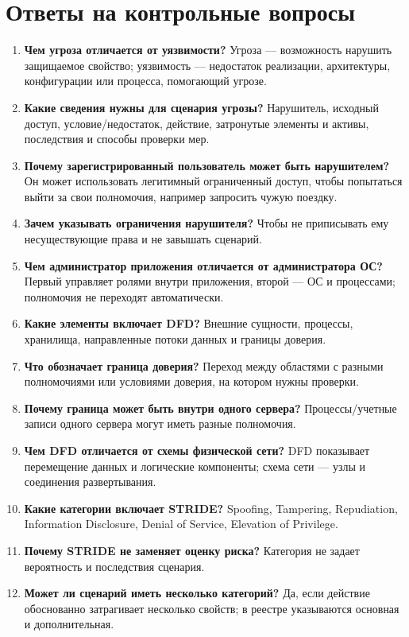 \documentclass[12pt,a4paper]{article}
\begin{document}
\section{Ответы на контрольные вопросы}
\begin{enumerate}[leftmargin=1.0cm]
\item \textbf{Чем угроза отличается от уязвимости?} Угроза — возможность нарушить защищаемое свойство; уязвимость — недостаток реализации, архитектуры, конфигурации или процесса, помогающий угрозе.
\item \textbf{Какие сведения нужны для сценария угрозы?} Нарушитель, исходный доступ, условие/недостаток, действие, затронутые элементы и активы, последствия и способы проверки мер.
\item \textbf{Почему зарегистрированный пользователь может быть нарушителем?} Он может использовать легитимный ограниченный доступ, чтобы попытаться выйти за свои полномочия, например запросить чужую поездку.
\item \textbf{Зачем указывать ограничения нарушителя?} Чтобы не приписывать ему несуществующие права и не завышать сценарий.
\item \textbf{Чем администратор приложения отличается от администратора ОС?} Первый управляет ролями внутри приложения, второй — ОС и процессами; полномочия не переходят автоматически.
\item \textbf{Какие элементы включает DFD?} Внешние сущности, процессы, хранилища, направленные потоки данных и границы доверия.
\item \textbf{Что обозначает граница доверия?} Переход между областями с разными полномочиями или условиями доверия, на котором нужны проверки.
\item \textbf{Почему граница может быть внутри одного сервера?} Процессы/учетные записи одного сервера могут иметь разные полномочия.
\item \textbf{Чем DFD отличается от схемы физической сети?} DFD показывает перемещение данных и логические компоненты; схема сети — узлы и соединения развертывания.
\item \textbf{Какие категории включает STRIDE?} Spoofing, Tampering, Repudiation, Information Disclosure, Denial of Service, Elevation of Privilege.
\item \textbf{Почему STRIDE не заменяет оценку риска?} Категория не задает вероятность и последствия сценария.
\item \textbf{Может ли сценарий иметь несколько категорий?} Да, если действие обоснованно затрагивает несколько свойств; в реестре указываются основная и дополнительная.

\end{enumerate}
\end{document}

